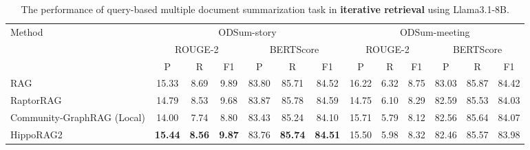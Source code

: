 \begin{table}[t]
\centering
\small
\caption{The performance of query-based multiple document summarization task in \textbf{iterative retrieval} using Llama3.1-8B.}
\label{tab:odsum_ircot_8b}
\setlength{\tabcolsep}{4pt}
\begin{tabular}{l|ccc|ccc|ccc|ccc}
\toprule
\multirow{2}{*}{Method} 
& \multicolumn{6}{c|}{ODSum-story} 
& \multicolumn{6}{c}{ODSum-meeting} \\
\cmidrule(lr){2-7} \cmidrule(lr){8-13}
& \multicolumn{3}{c|}{ROUGE-2} 
& \multicolumn{3}{c|}{BERTScore} 
& \multicolumn{3}{c|}{ROUGE-2} 
& \multicolumn{3}{c}{BERTScore} \\
\cmidrule(lr){2-4} \cmidrule(lr){5-7}
\cmidrule(lr){8-10} \cmidrule(lr){11-13}
& P & R & F1 & P & R & F1 & P & R & F1 & P & R & F1 \\
\midrule
RAG 
& 15.33 & 8.69 & 9.89 
& 83.80 & 85.71 & 84.52 
& 16.22 & 6.32 & 8.75 
& 83.03 & 85.87 & 84.42 \\

RaptorRAG 
& 14.79 & 8.53 & 9.68 
& 83.87 & 85.78 & 84.59 
& 14.75 & 6.10 & 8.29 
& 82.59 & 85.53 & 84.03 \\

Community-GraphRAG (Local) 
& 14.00 & 7.74 & 8.80 
& 83.43 & 85.24 & 84.10 
& 15.71 & 5.79 & 8.12 
& 82.56 & 85.64 & 84.07 \\

HippoRAG2 
& \textbf{15.44} & \textbf{8.56} & \textbf{9.87} 
& 83.76 & \textbf{85.74} & \textbf{84.51} 
& 15.50 & 5.98 & 8.32 
& 82.46 & 85.57 & 83.98 \\
\bottomrule
\end{tabular}

\end{table}




